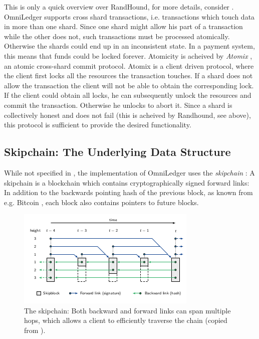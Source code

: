\documentclass[11pt, a4paper, twoside, openright]{article} %
\begin{document}
This is only a quick overview over RandHound, for more details, consider
\cite{syta2017randhound}.\\

OmniLedger supports cross shard transactions, i.e. transactions which touch
data in more than one shard. Since one shard might allow his part of a
transaction while the other does not, such
transactions must be processed atomically. Otherwise the shards could end up
in an inconsistent state. In a payment system, this means that funds could
be locked forever.
Atomicity is acheived by \textit{Atomix} \cite{KokorisKogias2017OmniLedgerAS},
an atomic cross-shard commit protocol. 
Atomix is a client driven protocol, where the client first locks all the
resources the transaction touches. If a shard does not allow the transaction
the client will not be able to obtain the corresponding lock.
If the client could obtain all locks, he can subsequently unlock the resources
and commit the transaction. Otherwise he unlocks to abort it.
Since a shard is collectively honest and does not fail (this is acheived by
Randhound, see above), this protocol is sufficient to provide the desired
functionality.\\

\subsection{Skipchain: The Underlying Data Structure}
While not specified in \cite{KokorisKogias2017OmniLedgerAS}, the implementation
of OmniLedger uses the \textit{skipchain} \cite{nikitin2017chainiac}:
A skipchain is a blockchain which contains cryptographically signed forward
links:
In addition to the backwards pointing hash of the previous block, as known from
e.g. Bitcoin \cite{nakamoto2008bitcoin}, each block also contains pointers to 
future blocks.

\begin{figure}[htb!]
    \centering
    \includegraphics[scale=0.9]{skipchain.png}
    \caption{The skipchain: Both backward and forward links can span multiple
    hops, which allows a client to efficiently traverse the chain
    (copied from \cite{nikitin2017chainiac}).}
\end{figure}
\end{document}
